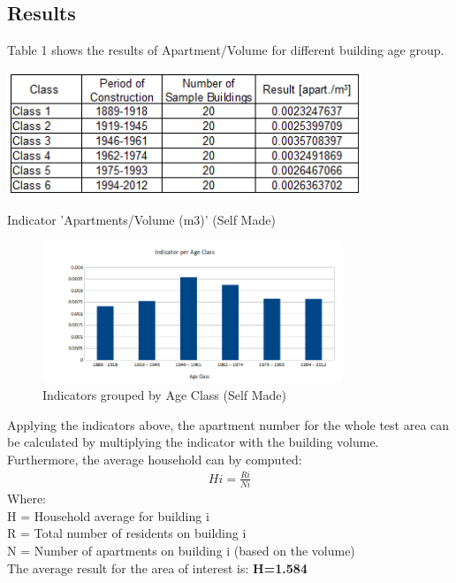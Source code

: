 \subsection{Results}


Table 1 shows the results of Apartment/Volume for different building age group.

\begin{table}[ht]
	\centering
	\includegraphics[width=0.8\textwidth]{phase1/group3/fig5.PNG}
	\caption{Indicator 'Apartments/Volume (m3)' (Self Made)}
	\label{fig:figure5}
\end{table}


\begin{figure}[ht]
	\centering
	\includegraphics[width=0.8\textwidth]{phase1/group3/fig6.PNG}
	\caption{Indicators grouped by Age Class (Self Made)}
	\label{fig:figure6}
\end{figure}

Applying the indicators above, the apartment number for the whole test area can be calculated by multiplying the indicator with the building volume. Furthermore, the average household can by computed:\\
\begin{align}
Hi=\frac{Ri}{Ni}
\end{align}
Where:\\
H = Household average for building i\\
R = Total number of residents on building i\\
N = Number of apartments on building i (based on the volume)\\

The average result for the area of interest is: \textbf{H=1.584}
\\

